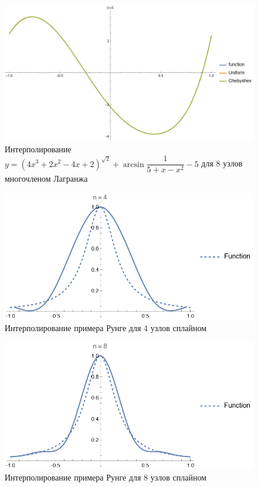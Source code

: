 \documentclass{article}
\begin{document}
    \begin{figure}[H]
        \includegraphics[width=\textwidth]{test8.png}
        \caption{Интерполирование$y = (4x^3 + 2x^2 - 4x + 2 )^{\sqrt{2}} + \arcsin{\dfrac{1}{5+x - x^2}} - 5$ для 8 узлов многочленом Лагранжа}
    \end{figure}
    \begin{figure}[H]
        \includegraphics[width=\textwidth]{splinerunge4.png}
        \caption{{Интерполирование примера Рунге для 4 узлов сплайном}}
    \end{figure}
    \begin{figure}[H]
        \includegraphics[width=\textwidth]{splinerunge8.png}
        \caption{{Интерполирование примера Рунге для 8 узлов сплайном}}
    \end{figure}
\end{document}
